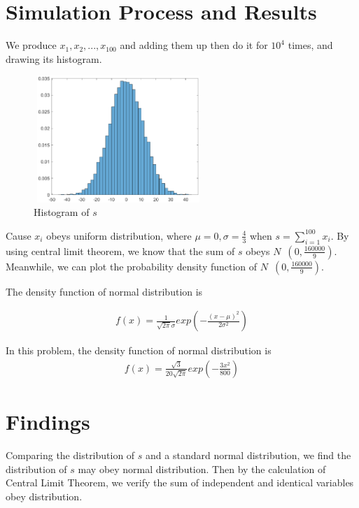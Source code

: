 \documentclass[conference]{IEEEtran}
\begin{document}
\section{Simulation Process and Results}
We produce $x_1, x_2, ...,x_{100}$ and adding them up then do it for $10^4$ times, and drawing its histogram.
\begin{figure}[htbp]
\centering
\includegraphics[height=48mm,width=64mm]{Histogram.eps}
\caption{Histogram of $s$}
\centering
\label{fig:System_Model} \vspace{2mm}
\end{figure}

Cause $x_{i}$ obeys uniform distribution, where $\mu = 0, \sigma = \frac{4}{3}$ when $s = \sum_{i = 1}^{100}x_i$. By using central limit theorem, we know that the sum of $s$ obeys $N$~$(0,\frac{160000}{9})$. Meanwhile, we can plot the probability density function of $N$~$(0,\frac{160000}{9})$.

The density function of normal distribution is

\begin{align}
	f(x)=\frac{1}{\sqrt{2\pi}\sigma}exp\left(-\frac{(x-\mu)^2}{2\sigma^2}\right)
\end{align}

In this problem, the density function of normal distribution is
\begin{align}
	f(x)=\frac{\sqrt{3}}{20\sqrt{2\pi}}exp\left(-\frac{3 x^2}{800}\right)
\end{align}



\section{Findings}
Comparing the distribution of $s$ and a standard normal distribution, we find the distribution of $s$ may obey normal distribution. Then by the calculation of Central Limit Theorem, we verify the sum of independent and identical variables obey distribution.
\end{document}
